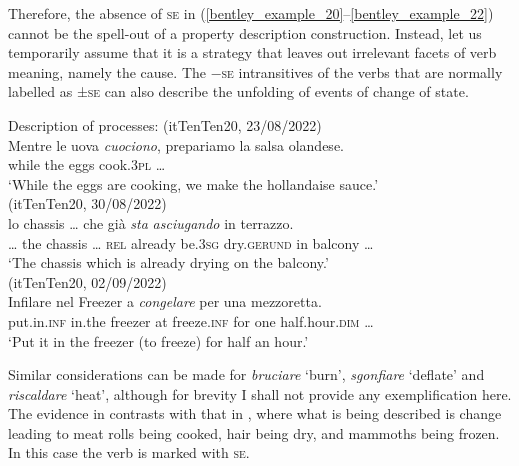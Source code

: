 \documentclass[output=paper,colorlinks,citecolor=brown
]{langscibook}
\begin{document}
Therefore, the absence of \textsc{se} in (\ref{bentley_example_20}--\ref{bentley_example_22}) cannot be the spell-out of a property description construction. Instead, let us temporarily assume that it is a strategy that leaves out irrelevant facets of verb meaning, namely the cause. 
The −\textsc{se} intransitives of the verbs that are normally labelled as ±\textsc{se} can also describe the unfolding of events of change of state. 

\ea \label{bentley_example_24}
    Description of processes:
    \ea \label{bentley_example_24a}(itTenTen20, 23/08/2022)\\
    \gll Mentre	le			uova	\textit{cuociono}, { prepariamo la salsa olandese.} \\
    while			the		eggs		cook.3\textsc{pl} {\ldots} \\
    \glt ‘While the eggs are cooking, we make the hollandaise sauce.’ \\
    \ex \label{bentley_example_24b}(itTenTen20, 30/08/2022)\\
    \gll  {\ldots}  lo chassis  {\ldots}  che		già 				\textit{sta} 			\textit{asciugando}	in 	terrazzo.\\
    {\ldots} the	chassis	 {\ldots}				\textsc{rel}	already	be.3\textsc{sg}	dry.\textsc{gerund}	in		balcony	{\ldots} \\
    \glt 	‘The chassis which is already drying on the balcony.’ \\
    \ex \label{bentley_example_24c}(itTenTen20, 02/09/2022)\\
    \gll Infilare			nel			Freezer	a		\textit{congelare}		per 	una	mezzoretta.\\
    put.in.\textsc{inf}		in.the	freezer		at	freeze.\textsc{inf}	for		one	half.hour.\textsc{dim}	{\ldots} \\
    \glt 					‘Put it in the freezer (to freeze) for half an hour.’ \\
    \z
\z

Similar considerations can be made for \textit{bruciare} ‘burn’, \textit{sgonfiare} ‘deflate’ and \textit{riscaldare} ‘heat’, although for brevity I shall not provide any exemplification here. 
The evidence in  contrasts with that in , where what is being described is change leading to meat rolls being cooked, hair being dry, and mammoths being frozen. In this case the verb is marked with \textsc{se}.
\end{document}
